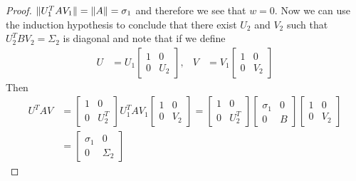 \begin{proof}
$\lVert U_1^T A V_1 \rVert = \lVert A \rVert = \sigma_1$ and therefore we see that $w = 0$.    Now we can use the induction hypothesis to conclude that there exist $U_2$ and $V_2$ such that
$U_2^T B V_2 = \Sigma_2$ is diagonal and note that if we define 
\begin{align*}
U &= 
U_1 \begin{bmatrix}
1 & 0 \\
0 & U_2
\end{bmatrix}, &
V &= V_1 
\begin{bmatrix}
1 & 0 \\
0 & V_2
\end{bmatrix}
\end{align*}
Then 
\begin{align*}
U^T A V 
&=
\begin{bmatrix}
1 & 0 \\
0 & U_2^T
\end{bmatrix} U_1^T A V_1 
\begin{bmatrix}
1 & 0 \\
0 & V_2
\end{bmatrix} 
= 
\begin{bmatrix}
1 & 0 \\
0 & U_2^T
\end{bmatrix}
\begin{bmatrix}
\sigma_1 & 0 \\
0 & B
\end{bmatrix}
\begin{bmatrix}
1 & 0 \\
0 & V_2
\end{bmatrix} \\
&= 
\begin{bmatrix}
\sigma_1 & 0 \\
0 & \Sigma_2
\end{bmatrix} 
\end{align*}
\end{proof}

